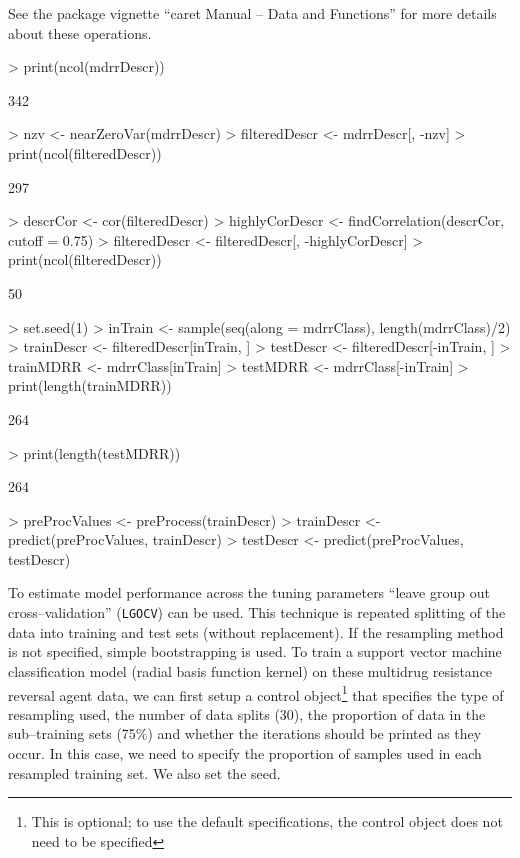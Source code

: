 \documentclass[12pt]{article}
\begin{document}
See the package vignette ``caret Manual -- Data and Functions'' for more details about these operations.

\begin{small}
\begin{Schunk}
\begin{Sinput}
> print(ncol(mdrrDescr))
\end{Sinput}
\begin{Soutput}
[1] 342
\end{Soutput}
\begin{Sinput}
> nzv <- nearZeroVar(mdrrDescr)
> filteredDescr <- mdrrDescr[, -nzv]
> print(ncol(filteredDescr))
\end{Sinput}
\begin{Soutput}
[1] 297
\end{Soutput}
\begin{Sinput}
> descrCor <- cor(filteredDescr)
> highlyCorDescr <- findCorrelation(descrCor, cutoff = 0.75)
> filteredDescr <- filteredDescr[, -highlyCorDescr]
> print(ncol(filteredDescr))
\end{Sinput}
\begin{Soutput}
[1] 50
\end{Soutput}
\begin{Sinput}
> set.seed(1)
> inTrain <- sample(seq(along = mdrrClass), length(mdrrClass)/2)
> trainDescr <- filteredDescr[inTrain, ]
> testDescr <- filteredDescr[-inTrain, ]
> trainMDRR <- mdrrClass[inTrain]
> testMDRR <- mdrrClass[-inTrain]
> print(length(trainMDRR))
\end{Sinput}
\begin{Soutput}
[1] 264
\end{Soutput}
\begin{Sinput}
> print(length(testMDRR))
\end{Sinput}
\begin{Soutput}
[1] 264
\end{Soutput}
\begin{Sinput}
> preProcValues <- preProcess(trainDescr)
> trainDescr <- predict(preProcValues, trainDescr)
> testDescr <- predict(preProcValues, testDescr)
\end{Sinput}
\end{Schunk}
\end{small}

To estimate model performance across the tuning parameters ``leave group out cross--validation'' (\texttt{LGOCV}) can be used. This technique is repeated splitting of the data into training and test sets (without replacement). If the resampling method is not specified, simple bootstrapping is used. To train a support vector machine classification model (radial basis function kernel) on these multidrug resistance reversal agent data, we can first setup a control object\footnote{This is optional; to use the default specifications, the control object does not need to be specified} that specifies the type of resampling used, the number of data splits (30), the proportion of data in the sub--training sets (75$\%$) and whether the iterations should be printed as they occur. In this case, we need to specify the proportion of samples used in each resampled training set. We also set the seed.
\end{document}
